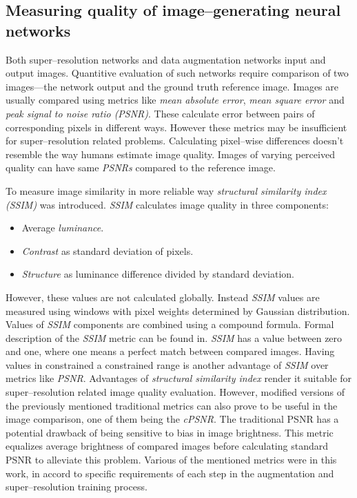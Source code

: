 \subsection{Measuring quality of image--generating neural networks}

Both super--resolution networks and data augmentation networks input and output images.
Quantitive evaluation of such networks require comparison of two images---the network output and the ground truth reference image.
Images are usually compared using metrics like \textit{mean absolute error}, \textit{mean square error} and \textit{peak signal to noise ratio (PSNR)}.
These calculate error between pairs of corresponding pixels in different ways.
However these metrics may be insufficient for super--resolution related problems.
Calculating pixel--wise differences doesn't resemble the way humans estimate image quality.
Images of varying perceived quality can have same \textit{PSNRs} compared to the reference image.

To measure image similarity in more reliable way \textit{structural similarity index (SSIM)} \cite{wang-2004-ssim} was introduced.
\textit{SSIM} calculates image quality in three components:
\begin{itemize}
	\item Average \textit{luminance}.
	\item \textit{Contrast} as standard deviation of pixels.
	\item \textit{Structure} as luminance difference divided by standard deviation.
\end{itemize}
However, these values are not calculated globally.
Instead \textit{SSIM} values are measured using windows with pixel weights determined by Gaussian distribution.
Values of \textit{SSIM} components are combined using a compound formula.
Formal description of the \textit{SSIM} metric can be found in.
\textit{SSIM} has a value between zero and one, where one means a perfect match between compared images.
Having values in constrained a constrained range is another advantage of \textit{SSIM} over metrics like \textit{PSNR}.
Advantages of \textit{structural similarity index} render it suitable for super--resolution related image quality evaluation.
However, modified versions of the previously mentioned traditional metrics can also prove to be useful in the image comparison, one of them being the \textit{cPSNR}.
The traditional PSNR has a potential drawback of being sensitive to bias in image brightness.
This metric equalizes average brightness of compared images before calculating standard PSNR to alleviate this problem.
Various of the mentioned metrics were in this work, in accord to specific requirements of each step in the augmentation and super--resolution training process.

